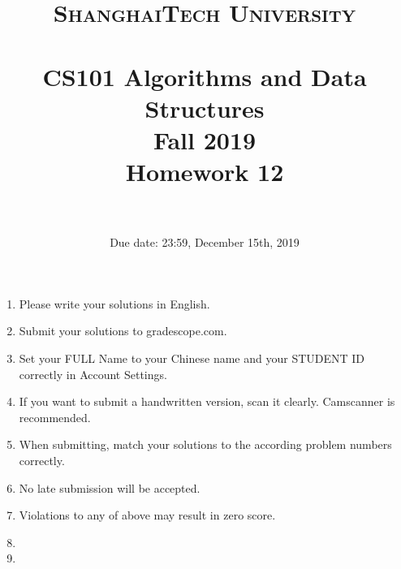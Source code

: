\documentclass{article}
\title{
    \normalfont \normalsize
    \textsc{ShanghaiTech University} \\ [25pt]
    \horrule{0.5pt} \\[0.4cm] %
    \huge CS101 Algorithms and Data Structures\\ %
    \LARGE Fall 2019\\
    \LARGE Homework 12\\
    \horrule{2pt} \\[0.5cm] %
}
\author{}
\date{Due date: 23:59, December 15th, 2019}
\begin{document}
\maketitle
\thispagestyle{firstpage}
\vspace{3ex}

\begin{enumerate}
\item Please write your solutions in English. 

\item Submit your solutions to gradescope.com.  

\item Set your FULL Name to your Chinese name and your STUDENT ID correctly in Account Settings. 

\item If you want to submit a handwritten version, scan it clearly. Camscanner is recommended. 

\item When submitting, match your solutions to the according problem numbers correctly. 

\item No late submission will be accepted.

\item Violations to any of above may result in zero score. 

\item {\large\color{red}{In this homework, all the algorithm design part need the four part proof. The demand is in the next page. If you do not use the four part proof, you will not get any point.}}

\item {\large\color{red}{In the algorithm design problem, you should design the correct algorithm whose running time is equal or smaller than the correct answer. If it's larger than the correct answer, you cannot get any point.}}

\end{enumerate}
\newpage
\end{document}
